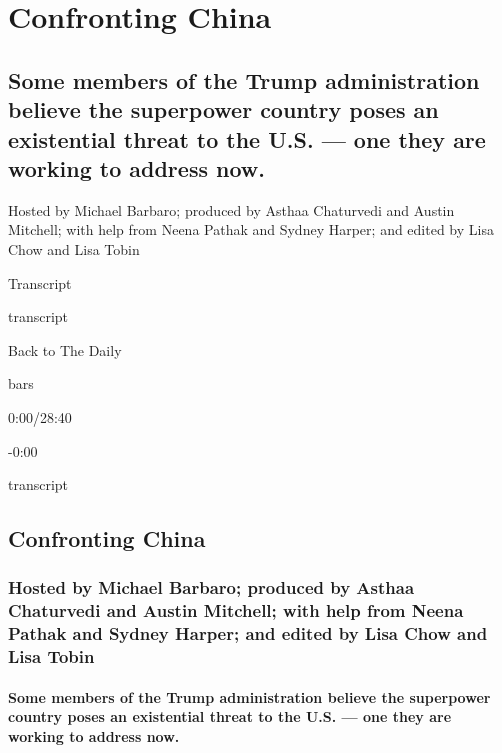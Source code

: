 \hypertarget{confronting-china-1}{%
\section{Confronting China}\label{confronting-china-1}}

\hypertarget{some-members-of-the-trump-administration-believe-the-superpower-country-poses-an-existential-threat-to-the-us--one-they-are-working-to-address-now-1}{%
\subsection{Some members of the Trump administration believe the
superpower country poses an existential threat to the U.S. --- one they
are working to address
now.}\label{some-members-of-the-trump-administration-believe-the-superpower-country-poses-an-existential-threat-to-the-us--one-they-are-working-to-address-now-1}}

Hosted by Michael Barbaro; produced by Asthaa Chaturvedi and Austin
Mitchell; with help from Neena Pathak and Sydney Harper; and edited by
Lisa Chow and Lisa Tobin

Transcript

transcript

Back to The Daily

bars

0:00/28:40

-0:00

transcript

\hypertarget{confronting-china-2}{%
\subsection{Confronting China}\label{confronting-china-2}}

\hypertarget{hosted-by-michael-barbaro-produced-by-asthaa-chaturvedi-and-austin-mitchell-with-help-from-neena-pathak-and-sydney-harper-and-edited-by-lisa-chow-and-lisa-tobin-1}{%
\subsubsection{Hosted by Michael Barbaro; produced by Asthaa Chaturvedi
and Austin Mitchell; with help from Neena Pathak and Sydney Harper; and
edited by Lisa Chow and Lisa
Tobin}\label{hosted-by-michael-barbaro-produced-by-asthaa-chaturvedi-and-austin-mitchell-with-help-from-neena-pathak-and-sydney-harper-and-edited-by-lisa-chow-and-lisa-tobin-1}}

\hypertarget{some-members-of-the-trump-administration-believe-the-superpower-country-poses-an-existential-threat-to-the-us--one-they-are-working-to-address-now-2}{%
\paragraph{Some members of the Trump administration believe the
superpower country poses an existential threat to the U.S. --- one they
are working to address
now.}\label{some-members-of-the-trump-administration-believe-the-superpower-country-poses-an-existential-threat-to-the-us--one-they-are-working-to-address-now-2}}

